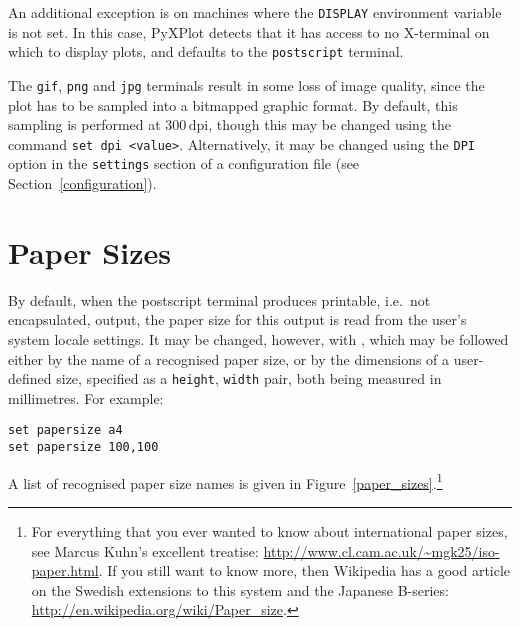 An additional exception is on machines where the {\tt DISPLAY} environment
variable is not set. In this case, PyXPlot detects that it has access to no
X-terminal on which to display plots, and defaults to the {\tt postscript}
terminal.

The {\tt gif}, {\tt png} and {\tt jpg} terminals result in some loss of image
quality, since the plot has to be sampled into a bitmapped graphic format.  By
default, this sampling is performed at $300\,\mathrm{dpi}$, though this may be
changed using the command {\tt set dpi <value>}. Alternatively, it may be
changed using the {\tt DPI} option in the {\tt settings} section of a
configuration file (see Section~\ref{configuration}).

\section{Paper Sizes}

By default, when the postscript terminal produces printable, i.e.\ not
encapsulated, output, the paper size for this output is read from the user's
system locale settings. It may be changed, however, with , which may be followed either by the name of a recognised paper
size, or by the dimensions of a user-defined size, specified as a {\tt height},
{\tt width} pair, both being measured in millimetres. For example:

\begin{verbatim}
set papersize a4
set papersize 100,100
\end{verbatim}

\noindent A list of recognised paper size names is given in
Figure~\ref{paper_sizes}.\footnote{For everything that you ever wanted to know
about international paper sizes, see Marcus Kuhn's excellent treatise:
\url{http://www.cl.cam.ac.uk/~mgk25/iso-paper.html}. If you still want to know
more, then Wikipedia has a good article on the Swedish extensions to this
system and the Japanese B-series:
\url{http://en.wikipedia.org/wiki/Paper_size}.}

